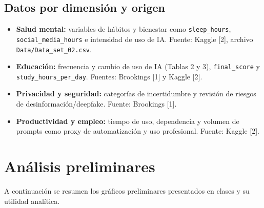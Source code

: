\documentclass[12pt,a4paper]{article}
\begin{document}
\subsection*{Datos por dimensión y origen}
\begin{itemize}
    \item \textbf{Salud mental:} variables de hábitos y bienestar como \texttt{sleep\_hours}, \texttt{social\_media\_hours} e intensidad de uso de IA. Fuente: Kaggle [2], archivo \texttt{Data/Data\_set\_02.csv}.
    \item \textbf{Educación:} frecuencia y cambio de uso de IA (Tablas 2 y 3), \texttt{final\_score} y \texttt{study\_hours\_per\_day}. Fuentes: Brookings [1] y Kaggle [2].
    \item \textbf{Privacidad y seguridad:} categorías de incertidumbre y revisión de riesgos de desinformación/deepfake. Fuente: Brookings [1].
    \item \textbf{Productividad y empleo:} tiempo de uso, dependencia y volumen de prompts como proxy de automatización y uso profesional. Fuente: Kaggle [2].
\end{itemize}

\section{Análisis preliminares}
A continuación se resumen los gráficos preliminares presentados en clases y su utilidad analítica.
\end{document}
